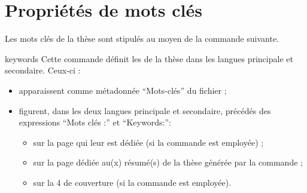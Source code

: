 \section{Propriétés de mots clés}
\label{sec:proprietes-de-mots}

Les mots clés de la thèse sont stipulés au moyen de la commande
 suivante.
%
\begin{docCommand}[doc description=\mandatory]{keywords}{}
  Cette commande définit les  de la thèse dans
  les langues principale et secondaire. Ceux-ci :
  \begin{itemize}
  \item apparaissent comme métadonnée \enquote{Mots-clés} du fichier \pdf ;
  \item figurent, dans les deux langues principale et secondaire, précédés des
    expressions \enquote{Mots clés :} et
    \foreignquote{english}{Keywords:}\selonlangue :
    \begin{itemize}
    \item sur la page qui leur est dédiée (si la commande 
      est employée) ;
    \item sur la page dédiée au(x) résumé(s) de la thèse générée par la
      commande  ;
    \item sur la 4\ieme{} de couverture (si la commande 
      est employée).
    \end{itemize}
  \end{itemize}
\end{docCommand}
%
\iffalse
\fi
